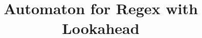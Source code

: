 \documentclass[acmsmall,screen,review,anonymous]{acmart}
\theoremstyle{definition}
\begin{document}
\title{Automaton for Regex with Lookahead}


\renewcommand{\shortauthors}{Anonymous Author(s)}




\maketitle






% 
% 





\end{document}
